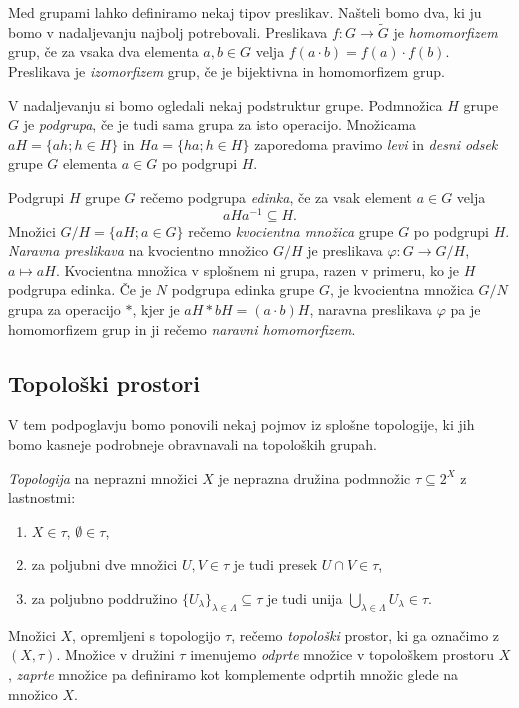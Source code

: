 \documentclass[mat1]{fmfdelo}
\begin{document}
Med grupami lahko definiramo nekaj tipov preslikav. Našteli bomo dva, ki ju bomo v nadaljevanju najbolj potrebovali.
Preslikava $f\colon G \to \widetilde{G}$ je \emph{homomorfizem} grup, če za vsaka dva elementa $a, b \in G$ velja $f(a\cdot b) = f(a)\cdot f(b)$.
Preslikava je \emph{izomorfizem} grup, če je bijektivna in homomorfizem grup.

V nadaljevanju si bomo ogledali nekaj podstruktur grupe.
Podmnožica $H$ grupe $G$ je \emph{podgrupa}, če je tudi sama grupa za isto operacijo.
Množicama $aH = \lbrace ah ; h \in H \rbrace$ in $Ha = \lbrace ha ; h \in H \rbrace$ zaporedoma pravimo \emph{levi} in \emph{desni odsek} grupe $G$ elementa $a \in G$ po podgrupi $H$.

Podgrupi $H$ grupe $G$ rečemo podgrupa \emph{edinka}, če za vsak element $a \in G$ velja \[aHa^{-1} \subseteq H.\]
Množici $G/H = \lbrace aH ; a \in G \rbrace$ rečemo \emph{kvocientna množica} grupe $G$ po podgrupi $H$.
\emph{Naravna preslikava} na kvocientno množico $G/H$ je preslikava $\varphi: G \to G/H$, $a \mapsto aH$.
Kvocientna množica v splošnem ni grupa, razen v primeru, ko je $H$ podgrupa edinka.
Če je $N$ podgrupa edinka grupe $G$, je kvocientna množica $G/N$ grupa za operacijo $*$, kjer je $aH*bH = (a\cdot b)H$, naravna preslikava $\varphi$ pa je homomorfizem grup in ji rečemo \emph{naravni homomorfizem}.

\subsection{Topološki prostori}
V tem podpoglavju bomo ponovili nekaj pojmov iz splo\-šne topologije, ki jih bomo kasneje podrobneje obravnavali na topoloških grupah.

\emph{Topologija} na neprazni množici $X$ je neprazna družina podmnožic $\tau \subseteq 2^X$ z lastnostmi:
\begin{enumerate}
\item $X \in \tau$, $\emptyset \in \tau$,
\item za poljubni dve množici $U,V \in \tau$ je tudi presek $U \cap V \in \tau$,
\item za poljubno poddružino $\lbrace U_{\lambda} \rbrace_{\lambda \in \Lambda} \subseteq \tau$ je tudi unija $\bigcup\limits_{\lambda \in \Lambda}^{} U_{\lambda} \in \tau$.
\end{enumerate}
Množici $X$, opremljeni s topologijo $\tau$, rečemo \emph{topološki} prostor, ki ga označimo z $(X, \tau)$. Množice v družini $\tau$ imenujemo \emph{odprte} množice v topološkem prostoru $X$, \emph{zaprte} množice pa definiramo kot komplemente odprtih množic glede na množico $X$.
\end{document}
